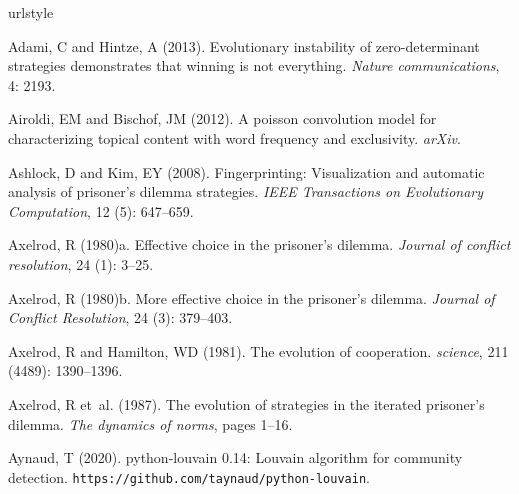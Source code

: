 \documentclass{article}
\theoremstyle{definition}
\begin{document}
\begin{thebibliography}{71}
    \providecommand{\natexlab}[1]{#1}
    \providecommand{\url}[1]{\texttt{#1}}
    \expandafter\ifx\csname urlstyle\endcsname\relax
      \providecommand{\doi}[1]{doi: #1}\else
      \providecommand{\doi}{doi: \begingroup \urlstyle{rm}\Url}\fi
    
    Adami, C and Hintze, A (2013).
    \newblock Evolutionary instability of zero-determinant strategies demonstrates
      that winning is not everything.
    \newblock \emph{Nature communications}, 4: 2193.
    
    Airoldi, EM and Bischof, JM (2012).
    \newblock A poisson convolution model for characterizing topical content with
      word frequency and exclusivity.
    \newblock \emph{arXiv}.
    
    Ashlock, D and Kim, EY (2008).
    \newblock Fingerprinting: Visualization and automatic analysis of prisoner's
      dilemma strategies.
    \newblock \emph{IEEE Transactions on Evolutionary Computation}, 12
      (5): 647--659.
    
    \bibitem[Axelrod(1980{\natexlab{a}})]{Axelrod1980}
    Axelrod, R (1980){\natexlab{a}}.
    \newblock Effective choice in the prisoner's dilemma.
    \newblock \emph{Journal of conflict resolution}, 24 (1):
      3--25.
    
    \bibitem[Axelrod(1980{\natexlab{b}})]{Axelrod1980more}
    Axelrod, R (1980){\natexlab{b}}.
    \newblock More effective choice in the prisoner's dilemma.
    \newblock \emph{Journal of Conflict Resolution}, 24 (3):
      379--403.
    
    Axelrod, R and Hamilton, WD (1981).
    \newblock The evolution of cooperation.
    \newblock \emph{science}, 211 (4489): 1390--1396.
    
    Axelrod, R et~al. (1987).
    \newblock The evolution of strategies in the iterated prisoner’s dilemma.
    \newblock \emph{The dynamics of norms}, pages 1--16.
    
    Aynaud, T (2020).
    \newblock python-louvain 0.14: Louvain algorithm for community detection.
    \newblock \url{https://github.com/taynaud/python-louvain}.
    

\end{thebibliography}
\end{document}
